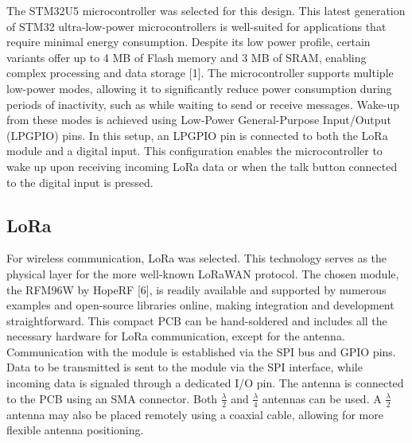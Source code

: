 The STM32U5 microcontroller was selected for this design. This latest generation of STM32 ultra-low-power microcontrollers is well-suited for applications that require minimal energy consumption.
Despite its low power profile, certain variants offer up to 4 MB of Flash memory and 3 MB of SRAM, enabling complex processing and data storage [1].
The microcontroller supports multiple low-power modes, allowing it to significantly reduce power consumption during periods of inactivity, such as while waiting to send or receive messages.
Wake-up from these modes is achieved using Low-Power General-Purpose Input/Output (LPGPIO) pins.
In this setup, an LPGPIO pin is connected to both the LoRa module and a digital input. This configuration enables the microcontroller to wake up upon receiving incoming LoRa data or when the talk button connected to the digital input is pressed.

\subsection{LoRa}


For wireless communication, LoRa was selected. This technology serves as the physical layer for the more well-known LoRaWAN protocol.
The chosen module, the RFM96W by HopeRF [6], is readily available and supported by numerous examples and open-source libraries online, making integration and development straightforward.
This compact PCB can be hand-soldered and includes all the necessary hardware for LoRa communication, except for the antenna.
Communication with the module is established via the SPI bus and GPIO pins.
Data to be transmitted is sent to the module via the SPI interface, while incoming data is signaled through a dedicated I/O pin.
The antenna is connected to the PCB using an SMA connector. Both $\frac{\lambda}{2}$ and $\frac{\lambda}{4}$ antennas can be used.
A $\frac{\lambda}{2}$ antenna may also be placed remotely using a coaxial cable, allowing for more flexible antenna positioning.

